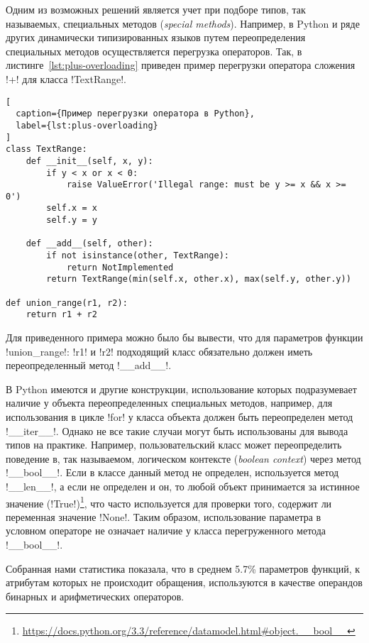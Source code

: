 Одним из возможных решений является учет при подборе типов, так называемых,
специальных методов (\emph{special methods}). Например,
в Python и ряде других динамически типизированных языков путем переопределения
специальных методов осуществляется перегрузка операторов.  Так, в
листинге~\ref{lst:plus-overloading} приведен пример перегрузки оператора
сложения !+! для класса !TextRange!.

\begin{lstlisting}[
  caption={Пример перегрузки оператора в Python},
  label={lst:plus-overloading}
]
сlass TextRange:
    def __init__(self, x, y):
        if y < x or x < 0:
            raise ValueError('Illegal range: must be y >= x && x >= 0')
        self.x = x
        self.y = y

    def __add__(self, other):
        if not isinstance(other, TextRange):
            return NotImplemented
        return TextRange(min(self.x, other.x), max(self.y, other.y))

def union_range(r1, r2):
    return r1 + r2    

\end{lstlisting}

Для приведенного примера можно было бы вывести, что для параметров функции
!union_range!: !r1! и !r2! подходящий класс обязательно должен иметь
переопределенный метод !__add__!. 

В Python имеются и другие конструкции, использование которых подразумевает
наличие у объекта переопределенных специальных методов, например, для
использования в цикле !for! у класса объекта должен быть переопределен метод
!__iter__!. Однако не все такие случаи могут быть использованы для вывода типов
на практике. Например, пользовательский класс может переопределить поведение в,
так называемом, логическом контексте (\emph{boolean context}) через метод
!__bool__!. Если в классе данный метод не определен, используется метод
!__len__!, а если не определен и он, то любой объект принимается за истинное
значение
(!True!)\footnote{\url{https://docs.python.org/3.3/reference/datamodel.html\#object.\_\_bool\_\_}},
что часто используется для проверки того, содержит ли переменная значение
!None!. Таким образом, использование параметра в условном операторе не означает
наличие у класса перегруженного метода !__bool__!.

Собранная нами статистика показала, что в среднем 5.7\% параметров функций, к
атрибутам которых не происходит обращения, используются в качестве операндов
бинарных и арифметических операторов.

